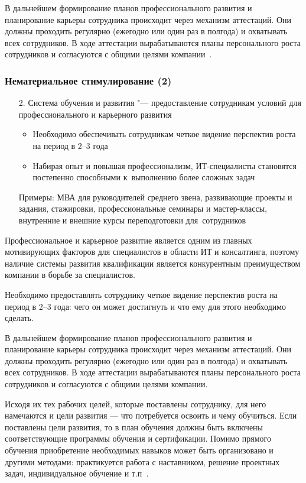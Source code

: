 \documentclass{../industrial-development}
\begin{document}
В дальнейшем формирование планов профессионального развития и планирование карьеры сотрудника происходит через механизм аттестаций. Они должны проходить регулярно (ежегодно или один раз в полгода) и охватывать всех сотрудников. В ходе аттестации вырабатываются планы персонального роста сотрудников и согласуются с общими целями компании~\cite{TriKitMotiv}.

\begin{frame} \frametitle{Нематериальное стимулирование (2)}
	\begin{itemize}					
		\item[2.] \alert{Система обучения и развития} "--- предоставление сотрудникам условий для профессионального и карьерного развития
		\begin{itemize}
			\item Необходимо обеспечивать сотрудникам четкое видение перспектив роста на период в 2--3 года
			\item Набирая опыт и повышая профессионализм, ИТ-специалисты
			становятся постепенно способными к~выполнению более сложных задач
		\end{itemize}
		Примеры: МВА для руководителей среднего звена, развивающие проекты и задания, стажировки, профессиональные семинары и мастер-классы, внутренние и внешние курсы переподготовки для~сотрудников
	\end{itemize}
\end{frame}

\lecturenotes

Профессиональное и карьерное развитие является одним из главных мотивирующих факторов для специалистов в области ИТ и консалтинга, поэтому наличие системы развития квалификации является конкурентным преимуществом компании в борьбе за специалистов.

Необходимо предоставлять сотруднику четкое видение перспектив роста на период в 2--3 года: чего он может достигнуть и что ему для этого необходимо сделать.

В дальнейшем формирование планов профессионального развития и планирование карьеры сотрудника происходит через механизм аттестаций. Они должны проходить регулярно (ежегодно или один раз в полгода) и охватывать всех сотрудников. В ходе аттестации вырабатываются планы персонального роста сотрудников и согласуются с общими целями компании.

Исходя их тех рабочих целей, которые поставлены сотруднику, для него намечаются и цели развития — что потребуется освоить и чему обучиться. Если поставлены цели развития, то в план обучения должны быть включены соответствующие программы обучения и сертификации. Помимо прямого обучения приобретение необходимых навыков может быть организовано и другими методами: практикуется работа с наставником, решение проектных задач, индивидуальное обучение и т.п~\cite{TriKitMotiv}.
\end{document}
